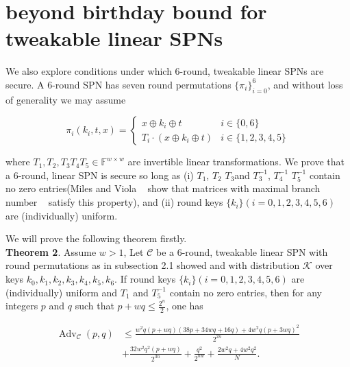   
  
  
  
  
  
  
  
  
  
  
  
  
  
  
  
  \section{beyond birthday bound for tweakable linear SPNs}
\label{section:beyond birthday bound for tweakable linear SPNs}

We also explore conditions under which 6-round, tweakable linear SPNs are secure. A 6-round SPN has seven round permutations $\{\pi_i\}_{i=0}^6$, and without loss of generality we may assume

$$
\pi_{i}\left(k_{i}, t, x\right)=\left\{\begin{array}{ll}
{x \oplus k_{i} \oplus t} & {i \in\{0,6\}} \\
{T_{i} \cdot\left(x \oplus k_{i} \oplus t \right)} & {i \in\{1,2,3,4,5\}}
\end{array}\right.
$$

where $T_{1}, T_{2}, T_{3} T_{4} T_{5}\in \mathbb{F}^{w \times w}$ are invertible linear transformations. We prove that a 6-round, linear SPN is secure so long as (i) $T_1$, $T_2$ $T_3$and $T_{3}^{-1}$, $T_{4}^{-1}$ $T_{5}^{-1}$ contain no zero entries(Miles and Viola ~\cite{miles2015substitution} show that matrices with maximal branch number ~\cite{daemen1995cipher} satisfy this property), and (ii) round keys $\{k_i\}(i=0, 1, 2, 3, 4, 5, 6)$ are (individually) uniform.

We will prove the following theorem firstly.\\

\noindent
\textbf{Theorem 2}. Assume $w>1$, Let $\mathcal{C}$ be a 6-round, tweakable linear SPN with round permutations as in subsection 2.1 showed and with distribution $\mathcal{K}$ over keys $k_{0}, k_{1}, k_{2}, k_{3}, k_{4}, k_{5}, k_{6}$. If round keys $\{k_i\}(i=0, 1, 2, 3, 4, 5, 6)$ are (individually) uniform and $T_1$ and $T_{5}^{-1}$ contain no zero entries, then for any integers $\mathit{p}$ and $\mathit{q}$ such that $p+wq \leq \frac{2^n}{2}$, one has

\begin{equation}
\begin{aligned}
\operatorname{Adv}_{\mathcal{C}}\left(p, q\right) &\leq \frac{w^2q(p+wq)(38p+34wq+16q)+4w^2q(p+3wq)^2}{2^{2n}}\\
& + \frac{32 w^2 q^2 (p+w q)}{2^{3n}}+\frac{q^2}{2^{nw}} + \frac{2 w^2 q + 4 w^2 q^2}{N}.
\end{aligned}
\end{equation}


